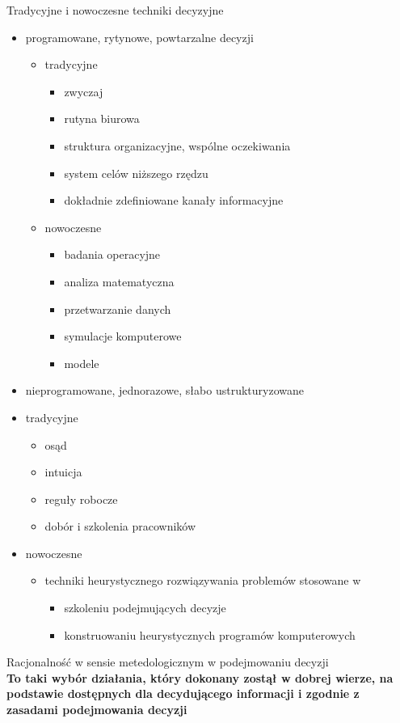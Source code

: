 \documentclass[a4paper,10pt]{report}
\begin{document}
\noindent Tradycyjne i nowoczesne techniki decyzyjne
\begin{itemize}
	\item programowane, rytynowe, powtarzalne decyzji
	\begin{itemize}
		\item tradycyjne
		\begin{itemize}
			\item zwyczaj
			\item rutyna biurowa
			\item struktura organizacyjne, wspólne oczekiwania
			\item system celów niższego rzędzu
			\item dokładnie zdefiniowane kanały informacyjne
		\end{itemize}
		\item nowoczesne
		\begin{itemize}
			\item badania operacyjne
			\item analiza matematyczna
			\item przetwarzanie danych
			\item symulacje komputerowe
			\item modele
		\end{itemize}
	\end{itemize}
	\item nieprogramowane, jednorazowe, słabo ustrukturyzowane
			\item tradycyjne
		\begin{itemize}
			\item osąd
			\item intuicja
			\item reguły robocze
			\item dobór i szkolenia pracowników
		\end{itemize}
		\item nowoczesne
		\begin{itemize}
			\item techniki heurystycznego rozwiązywania problemów stosowane w 
			\begin{itemize}
				\item szkoleniu podejmujących decyzje
				\item konstruowaniu heurystycznych programów komputerowych
			\end{itemize}
		\end{itemize}
\end{itemize}

Racjonalność w sensie metedologicznym w podejmowaniu decyzji\\
\textbf{To taki wybór działania, który dokonany zostął w dobrej wierze, na podstawie dostępnych dla decydującego informacji i zgodnie z zasadami podejmowania decyzji}\\
\end{document}
